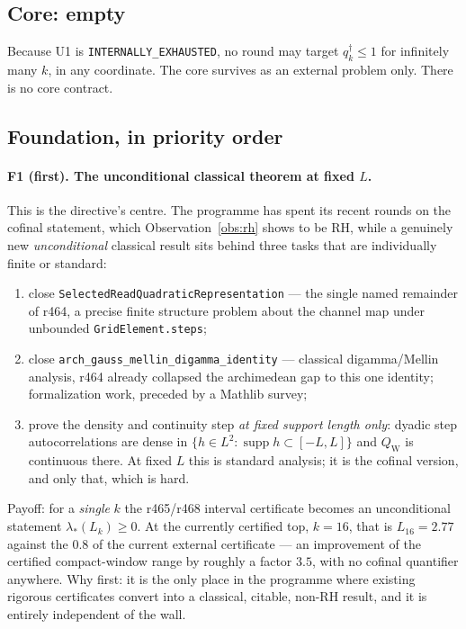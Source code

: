 \documentclass[11pt]{article}
\theoremstyle{remark}
\newcommand{\qdag}{q^{\dagger}}
\newcommand{\code}[1]{\nolinkurl{#1}}
\begin{document}
\subsection{Core: empty}

Because U1 is \texttt{INTERNALLY\_EXHAUSTED}, no round may target
$\qdag_k\le1$ for infinitely many $k$, in any coordinate.  The core
survives as an external problem only.  There is no core contract.

\subsection{Foundation, in priority order}

\paragraph{F1 (first).  The unconditional classical theorem at fixed
$L$.}
This is the directive's centre.  The programme has spent its recent
rounds on the cofinal statement, which
Observation~\ref{obs:rh} shows to be RH, while a genuinely new
\emph{unconditional} classical result sits behind three tasks that
are individually finite or standard:
\begin{enumerate}
\item[(i)] close \code{SelectedReadQuadraticRepresentation} --- the
single named remainder of r464, a precise finite structure problem
about the channel map under unbounded \code{GridElement.steps};
\item[(ii)] close \code{arch_gauss_mellin_digamma_identity} ---
classical digamma/Mellin analysis, r464 already collapsed the
archimedean gap to this one identity; formalization work, preceded by
a Mathlib survey;
\item[(iii)] prove the density and continuity step \emph{at fixed
support length only}: dyadic step autocorrelations are dense in
$\{h\in L^2:\operatorname{supp}h\subset[-L,L]\}$ and $Q_{\mathrm W}$
is continuous there.  At fixed $L$ this is standard analysis; it is
the cofinal version, and only that, which is hard.
\end{enumerate}
Payoff: for a \emph{single} $k$ the r465/r468 interval certificate
becomes an unconditional statement $\lambda_*(L_k)\ge0$.  At the
currently certified top, $k=16$, that is $L_{16}=2.77$ against the
$0.8$ of the current external certificate --- an improvement of the
certified compact-window range by roughly a factor $3.5$, with no
cofinal quantifier anywhere.  Why first: it is the only place in the
programme where existing rigorous certificates convert into a
classical, citable, non-RH result, and it is entirely independent of
the wall.
\end{document}
